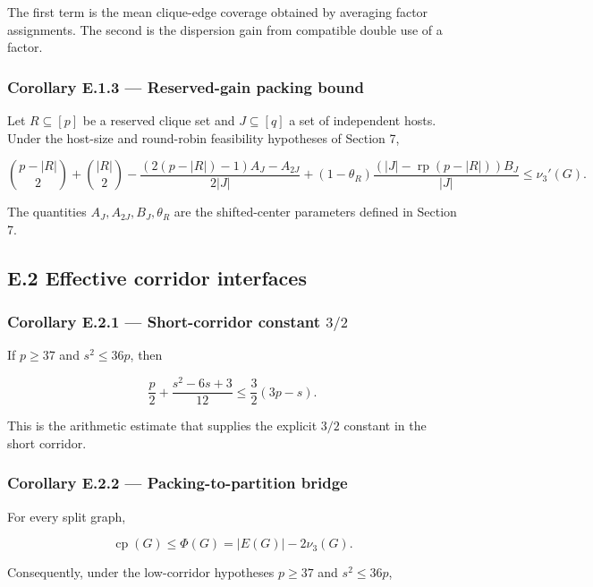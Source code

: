 \documentclass[english,11pt,a4paper]{article}
\begin{document}
The first term is the mean clique-edge coverage obtained by averaging
factor assignments. The second is the dispersion gain from compatible
double use of a factor.

\subsubsection{Corollary E.1.3 --- Reserved-gain packing
bound}\label{corollary-e.1.3-reserved-gain-packing-bound}

Let \(R\subseteq[p]\) be a reserved clique set and \(J\subseteq[q]\) a
set of independent hosts. Under the host-size and round-robin
feasibility hypotheses of Section 7,

\[
\binom{p-|R|}{2}+\binom{|R|}{2}
-
\frac{(2(p-|R|)-1)A_J-A_{2J}}{2|J|}
+
(1-\theta_R)\frac{(|J|-\operatorname{rp}(p-|R|))B_J}{|J|}
\le \nu_3'(G).
\]

The quantities \(A_J,A_{2J},B_J,\theta_R\) are the shifted-center
parameters defined in Section 7.

\subsection{E.2 Effective corridor
interfaces}\label{e.2-effective-corridor-interfaces}

\subsubsection{\texorpdfstring{Corollary E.2.1 --- Short-corridor
constant
\(3/2\)}{Corollary E.2.1 --- Short-corridor constant 3/2}}\label{corollary-e.2.1-short-corridor-constant-32}

If \(p\ge37\) and \(s^2\le36p\), then

\[
\frac p2+\frac{s^2-6s+3}{12}
\le
\frac32(3p-s).
\]

This is the arithmetic estimate that supplies the explicit \(3/2\)
constant in the short corridor.

\subsubsection{Corollary E.2.2 --- Packing-to-partition
bridge}\label{corollary-e.2.2-packing-to-partition-bridge}

For every split graph,

\[
\operatorname{cp}(G)\le \Phi(G)=|E(G)|-2\nu_3(G).
\]

Consequently, under the low-corridor hypotheses \(p\ge37\) and
\(s^2\le36p\),
\end{document}
